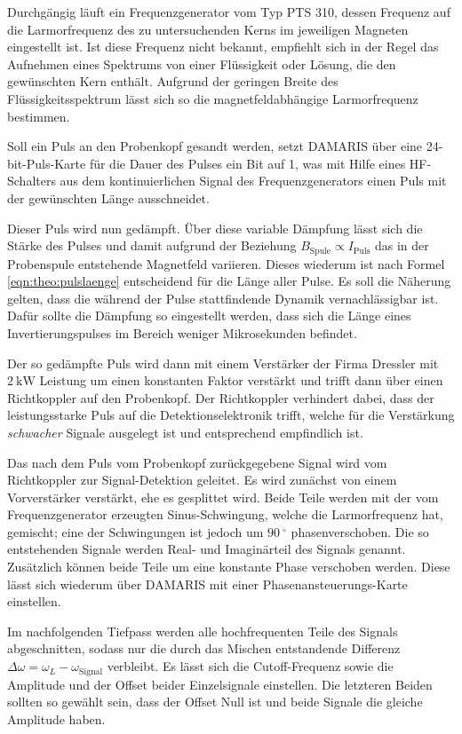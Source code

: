 Durchgängig läuft ein Frequenzgenerator vom Typ PTS 310, dessen Frequenz auf die Larmorfrequenz des zu untersuchenden Kerns im jeweiligen Magneten eingestellt ist. Ist diese Frequenz nicht bekannt, empfiehlt sich in der Regel das Aufnehmen eines Spektrums von einer Flüssigkeit oder Lösung, die den gewünschten Kern enthält. Aufgrund der geringen Breite des Flüssigkeitsspektrum lässt sich so die magnetfeldabhängige Larmorfrequenz bestimmen.

Soll ein Puls an den Probenkopf gesandt werden, setzt DAMARIS über eine 24-bit-Puls-Karte für die Dauer des Pulses ein Bit auf 1, was mit Hilfe eines HF-Schalters aus dem kontinuierlichen Signal des Frequenzgenerators einen Puls mit der gewünschten Länge ausschneidet.

Dieser Puls wird nun gedämpft. Über diese variable Dämpfung lässt sich die Stärke des Pulses und damit aufgrund der Beziehung $B_\text{Spule} \propto I_\text{Puls}$ das in der Probenspule entstehende Magnetfeld variieren. Dieses wiederum ist nach Formel \eqref{eqn:theo:pulslaenge} entscheidend für die Länge aller Pulse. Es soll die Näherung gelten, dass die während der Pulse stattfindende Dynamik vernachlässigbar ist. Dafür sollte die Dämpfung so eingestellt werden, dass sich die Länge eines Invertierungspulses im Bereich weniger Mikrosekunden befindet.

Der so gedämpfte Puls wird dann mit einem Verstärker der Firma Dressler mit $\SI{2}{\kilo\watt}$ Leistung um einen konstanten Faktor verstärkt und trifft dann über einen Richtkoppler auf den Probenkopf. Der Richtkoppler verhindert dabei, dass der leistungsstarke Puls auf die Detektionselektronik trifft, welche für die Verstärkung \emph{schwacher} Signale ausgelegt ist und entsprechend empfindlich ist.

Das nach dem Puls vom Probenkopf zurückgegebene Signal wird vom Richtkoppler zur Signal-Detektion geleitet. Es wird zunächst von einem Vorverstärker verstärkt, ehe es gesplittet wird. Beide Teile werden mit der vom Frequenzgenerator erzeugten Sinus-Schwingung, welche die Larmorfrequenz hat, gemischt; eine der Schwingungen ist jedoch um $\SI{90}{^\circ}$ phasenverschoben. Die so entstehenden Signale werden Real- und Imaginärteil des Signals genannt. Zusätzlich können beide Teile um eine konstante Phase verschoben werden. Diese lässt sich wiederum über DAMARIS mit einer Phasenansteuerungs-Karte einstellen.

Im nachfolgenden Tiefpass werden alle hochfrequenten Teile des Signals abgeschnitten, sodass nur die durch das Mischen entstandende Differenz $\Delta \omega = \omega_L - \omega_\text{Signal}$ verbleibt. Es lässt sich die Cutoff-Frequenz sowie die Amplitude und der Offset beider Einzelsignale einstellen. Die letzteren Beiden sollten so gewählt sein, dass der Offset Null ist und beide Signale die gleiche Amplitude haben.


